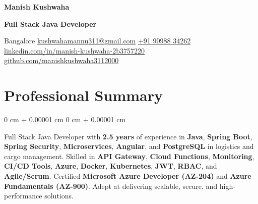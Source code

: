 \documentclass[10pt, letterpaper]{article}
\newenvironment{onecolentry}{
    \begin{adjustwidth}{
        0 cm + 0.00001 cm
    }{
        0 cm + 0.00001 cm
    }
}{
    \end{adjustwidth}
}
\newenvironment{header}{
    \setlength{\topsep}{0pt}\par\kern\topsep\centering\linespread{1.5}
}{
    \par\kern\topsep
}
\begin{document}
    \newcommand{\AND}{\unskip
        \cleaders\copy\ANDbox\hskip\wd\ANDbox
        \ignorespaces
    }
    \newsavebox\ANDbox
    \sbox\ANDbox{$|$}

    \begin{header}
        \fontsize{22pt}{22pt}\selectfont \textbf{Manish Kushwaha}

        \vspace{2pt}

        \normalsize \textbf{Full Stack Java Developer}

        \vspace{3pt}

        \small
        \faMapMarker \hspace{1pt} Bangalore \quad
        \faEnvelope \hspace{1pt} \href{mailto:kushwahamannu311@gmail.com}{kushwahamannu311@gmail.com} \quad
        \faPhone \hspace{1pt} \href{tel:+91-9098834262}{+91 90988 34262} \hspace{1pt}
        \faLinkedin \hspace{1pt} \href{https://linkedin.com/in/manish-kushwaha-2b3757220}{linkedin.com/in/manish-kushwaha-2b3757220} \quad
        \faGithub \hspace{2pt} \href{https://github.com/manishkushwaha3112000}{github.com/manishkushwaha3112000}
    \end{header}

    \vspace{2pt}

\section{Professional Summary}
\begin{onecolentry}
Full Stack Java Developer with \textbf{2.5 years} of experience in \textbf{Java}, \textbf{Spring Boot}, \textbf{Spring Security}, \textbf{Microservices}, \textbf{Angular}, and \textbf{PostgreSQL} in logistics and cargo management. Skilled in \textbf{API Gateway}, \textbf{Cloud Functions}, \textbf{Monitoring}, \textbf{CI/CD Tools}, \textbf{Azure}, \textbf{Docker}, \textbf{Kubernetes}, \textbf{JWT}, \textbf{RBAC}, and \textbf{Agile/Scrum}. Certified \textbf{Microsoft Azure Developer (AZ-204)} and \textbf{Azure Fundamentals (AZ-900)}. Adept at delivering scalable, secure, and high-performance solutions.
\end{onecolentry}
\end{document}
